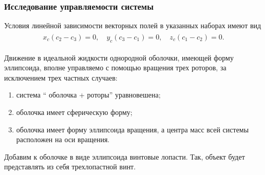 \begin{frame}
\frametitle{Исследование управляемости системы}

Условия линейной зависимости векторных полей в указанных наборах имеют вид
\begin{gather*}
\begin{gathered}
x_c(c_2 - c_3) = 0,\quad
y_c(c_3-c_1) = 0, \quad
z_c(c_1-c_2) = 0.
\end{gathered}
\end{gather*}

Движение в идеальной жидкости однородной оболочки, имеющей форму эллипсоида, вполне управляемо с помощью вращения трех роторов, за исключением трех частных случаев:
\begin{enumerate}
	\item система “ оболочка + роторы” уравновешена;
	\item оболочка имеет сферическую форму;
	\item оболочка имеет форму эллипсоида вращения, а центра масс всей системы	расположен на оси вращения.
\end{enumerate}

Добавим к оболочке в виде эллипсоида винтовые лопасти. Так, объект будет представлять из себя трехлопастной винт.

\end{frame}

